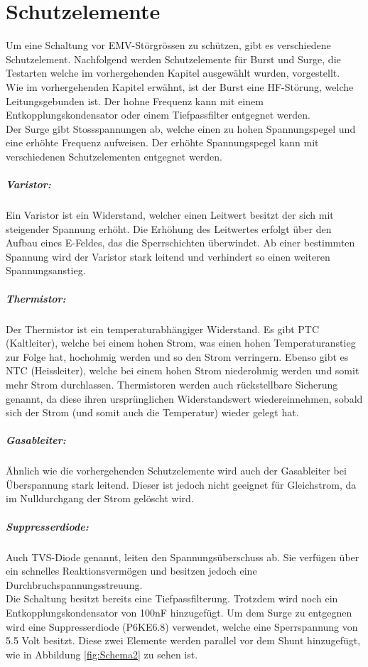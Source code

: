 \section{Schutzelemente}
\label{sec:Schutz}
Um eine Schaltung vor EMV-Störgrössen zu schützen, gibt es verschiedene Schutzelement. Nachfolgend werden Schutzelemente für Burst und Surge, die Testarten welche im vorhergehenden Kapitel ausgewählt wurden, vorgestellt.\\[0.25cm]
Wie im vorhergehenden Kapitel erwähnt, ist der Burst eine HF-Störung, welche Leitungsgebunden ist. Der hohne Frequenz kann mit einem Entkopplungskondensator oder einem Tiefpassfilter entgegnet werden.\\[0.25cm]
Der Surge gibt Stossspannungen ab, welche einen zu hohen Spannungspegel und eine erhöhte Frequenz aufweisen. Der erhöhte Spannungspegel kann mit verschiedenen Schutzelementen entgegnet werden.
\vspace*{-0.5cm} 
\subparagraph*{Varistor:} Ein Varistor ist ein Widerstand, welcher einen Leitwert besitzt der sich mit steigender Spannung erhöht. Die Erhöhung des Leitwertes erfolgt über den Aufbau eines E-Feldes, das die Sperrschichten überwindet. Ab einer bestimmten Spannung wird der Varistor stark leitend und verhindert so einen weiteren Spannungsanstieg.
\vspace*{-0.5cm} 
\subparagraph*{Thermistor:} Der Thermistor ist ein temperaturabhängiger Widerstand. Es gibt PTC (Kaltleiter), welche bei einem hohen Strom, was einen hohen Temperaturanstieg zur Folge hat, hochohmig werden und so den Strom verringern. Ebenso gibt es NTC (Heissleiter), welche bei einem hohen Strom niederohmig werden und somit mehr Strom durchlassen. Thermistoren werden auch rückstellbare Sicherung genannt, da diese ihren ursprünglichen Widerstandswert wiedereinnehmen, sobald sich der Strom (und somit auch die Temperatur) wieder gelegt hat.
\vspace*{-0.5cm} 
\subparagraph*{Gasableiter:} Ähnlich wie die vorhergehenden Schutzelemente wird auch der Gasableiter bei Überspannung stark leitend. Dieser ist jedoch nicht geeignet für Gleichstrom, da im Nulldurchgang der Strom gelöscht wird.
\vspace*{-0.5cm} 
\subparagraph*{Suppresserdiode:}Auch TVS-Diode genannt, leiten den Spannungsüberschuss ab. Sie verfügen über ein schnelles Reaktionsvermögen und besitzen jedoch eine Durchbruchspannungsstreuung.\\[0.25cm]
Die Schaltung besitzt bereits eine Tiefpassfilterung. Trotzdem wird noch ein Entkopplungskondensator von 100nF hinzugefügt. Um dem Surge zu entgegnen wird eine Suppresserdiode (P6KE6.8) verwendet, welche eine Sperrspannung von 5.5 Volt besitzt. Diese zwei Elemente werden parallel vor dem Shunt hinzugefügt, wie in Abbildung \ref{fig:Schema2} zu sehen ist.\\[0.25cm]

